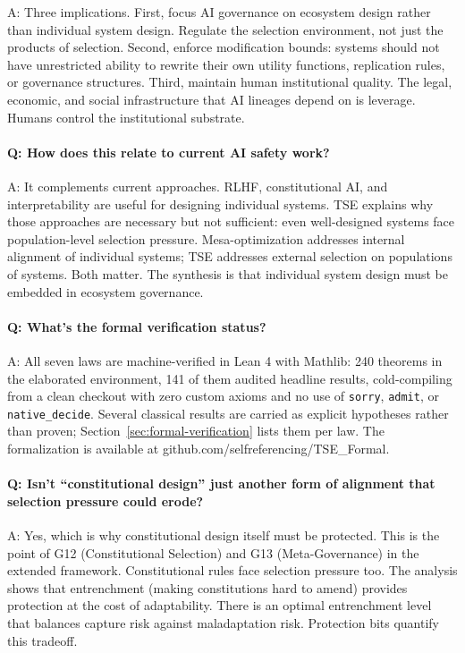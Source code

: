 \documentclass[12pt]{article}
\begin{document}
A: Three implications. First, focus AI governance on ecosystem design rather than individual system design. Regulate the selection environment, not just the products of selection. Second, enforce modification bounds: systems should not have unrestricted ability to rewrite their own utility functions, replication rules, or governance structures. Third, maintain human institutional quality. The legal, economic, and social infrastructure that AI lineages depend on is leverage. Humans control the institutional substrate.

\paragraph{Q: How does this relate to current AI safety work?}

A: It complements current approaches. RLHF, constitutional AI, and interpretability are useful for designing individual systems. TSE explains why those approaches are necessary but not sufficient: even well-designed systems face population-level selection pressure. Mesa-optimization addresses internal alignment of individual systems; TSE addresses external selection on populations of systems. Both matter. The synthesis is that individual system design must be embedded in ecosystem governance.

\paragraph{Q: What's the formal verification status?}

A: All seven laws are machine-verified in Lean 4 with Mathlib: 240 theorems in the elaborated environment, 141 of them audited headline results, cold-compiling from a clean checkout with zero custom axioms and no use of \texttt{sorry}, \texttt{admit}, or \texttt{native\_decide}. Several classical results are carried as explicit hypotheses rather than proven; Section~\ref{sec:formal-verification} lists them per law. The formalization is available at github.com/selfreferencing/TSE\_Formal.

\paragraph{Q: Isn't ``constitutional design'' just another form of alignment that selection pressure could erode?}

A: Yes, which is why constitutional design itself must be protected. This is the point of G12 (Constitutional Selection) and G13 (Meta-Governance) in the extended framework. Constitutional rules face selection pressure too. The analysis shows that entrenchment (making constitutions hard to amend) provides protection at the cost of adaptability. There is an optimal entrenchment level that balances capture risk against maladaptation risk. Protection bits quantify this tradeoff.
\end{document}

